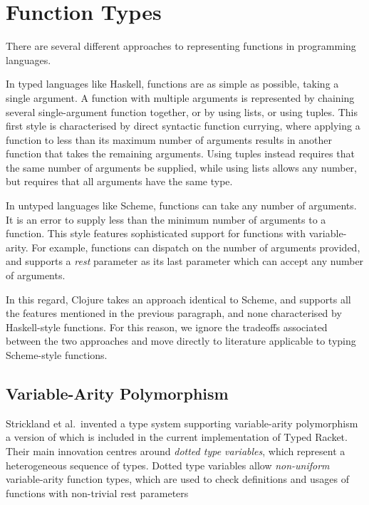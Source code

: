 \section{Function Types}

There are several different approaches to representing functions in programming languages.

In typed languages like Haskell, functions are as simple as possible, taking a single argument.
A function with multiple arguments is represented by chaining several single-argument function
together, or by using lists, or using tuples. This first style is characterised by direct syntactic function currying, where applying
a function to less than its maximum number of arguments results in another function
that takes the remaining arguments.
Using tuples instead requires that the same number of arguments be supplied,
while using lists allows any number, but requires that all arguments have the same type.

In untyped languages like Scheme, functions can take any number of arguments. It is an
error to supply less than the minimum number of arguments to a function.
This style features sophisticated support for functions with variable-arity. For example,
functions can dispatch on the number of arguments provided, and supports a \emph{rest} parameter
as its last parameter which can accept any number of arguments.

In this regard, Clojure takes an approach identical to Scheme, and supports all the features
mentioned in the previous paragraph, and none characterised by Haskell-style functions.
For this reason, we ignore the tradeoffs associated between the two approaches 
and move directly to literature applicable to typing Scheme-style functions.

\subsection{Variable-Arity Polymorphism}
\label{sec:variablearity}

Strickland et al.\ invented a type system supporting variable-arity polymorphism~\cite{STF09}
a version of which is included in the current implementation of Typed Racket.
Their main innovation centres around \emph{dotted type variables}, which represent a heterogeneous sequence
of types. Dotted type variables allow \emph{non-uniform} variable-arity function types,
which are used to check definitions and usages of functions with non-trivial rest parameters


